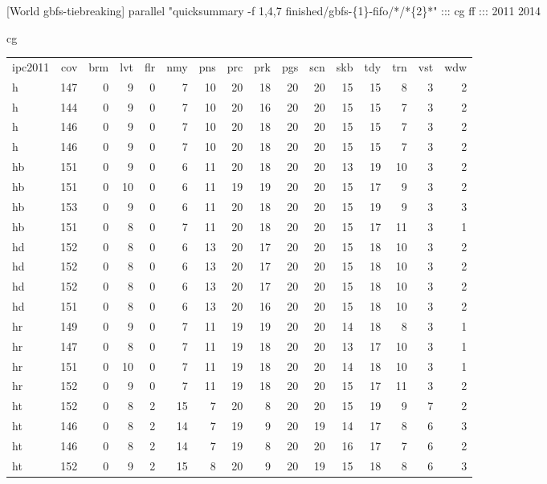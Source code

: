 [World gbfs-tiebreaking] parallel "quicksummary -f 1,4,7 finished/gbfs-\{1\}-fifo/*/*\{2\}*" ::: cg ff ::: 2011 2014

cg

\begin{center}
\begin{tabular}{lrrrrrrrrrrrrrrr}
ipc2011 & cov & brm & lvt & flr & nmy & pns & prc & prk & pgs & scn & skb & tdy & trn & vst & wdw\\
h & 147 & 0 & 9 & 0 & 7 & 10 & 20 & 18 & 20 & 20 & 15 & 15 & 8 & 3 & 2\\
h & 144 & 0 & 9 & 0 & 7 & 10 & 20 & 16 & 20 & 20 & 15 & 15 & 7 & 3 & 2\\
h & 146 & 0 & 9 & 0 & 7 & 10 & 20 & 18 & 20 & 20 & 15 & 15 & 7 & 3 & 2\\
h & 146 & 0 & 9 & 0 & 7 & 10 & 20 & 18 & 20 & 20 & 15 & 15 & 7 & 3 & 2\\
hb & 151 & 0 & 9 & 0 & 6 & 11 & 20 & 18 & 20 & 20 & 13 & 19 & 10 & 3 & 2\\
hb & 151 & 0 & 10 & 0 & 6 & 11 & 19 & 19 & 20 & 20 & 15 & 17 & 9 & 3 & 2\\
hb & 153 & 0 & 9 & 0 & 6 & 11 & 20 & 18 & 20 & 20 & 15 & 19 & 9 & 3 & 3\\
hb & 151 & 0 & 8 & 0 & 7 & 11 & 20 & 18 & 20 & 20 & 15 & 17 & 11 & 3 & 1\\
hd & 152 & 0 & 8 & 0 & 6 & 13 & 20 & 17 & 20 & 20 & 15 & 18 & 10 & 3 & 2\\
hd & 152 & 0 & 8 & 0 & 6 & 13 & 20 & 17 & 20 & 20 & 15 & 18 & 10 & 3 & 2\\
hd & 152 & 0 & 8 & 0 & 6 & 13 & 20 & 17 & 20 & 20 & 15 & 18 & 10 & 3 & 2\\
hd & 151 & 0 & 8 & 0 & 6 & 13 & 20 & 16 & 20 & 20 & 15 & 18 & 10 & 3 & 2\\
hr & 149 & 0 & 9 & 0 & 7 & 11 & 19 & 19 & 20 & 20 & 14 & 18 & 8 & 3 & 1\\
hr & 147 & 0 & 8 & 0 & 7 & 11 & 19 & 18 & 20 & 20 & 13 & 17 & 10 & 3 & 1\\
hr & 151 & 0 & 10 & 0 & 7 & 11 & 19 & 18 & 20 & 20 & 14 & 18 & 10 & 3 & 1\\
hr & 152 & 0 & 9 & 0 & 7 & 11 & 19 & 18 & 20 & 20 & 15 & 17 & 11 & 3 & 2\\
ht & 152 & 0 & 8 & 2 & 15 & 7 & 20 & 8 & 20 & 20 & 15 & 19 & 9 & 7 & 2\\
ht & 146 & 0 & 8 & 2 & 14 & 7 & 19 & 9 & 20 & 19 & 14 & 17 & 8 & 6 & 3\\
ht & 146 & 0 & 8 & 2 & 14 & 7 & 19 & 8 & 20 & 20 & 16 & 17 & 7 & 6 & 2\\
ht & 152 & 0 & 9 & 2 & 15 & 8 & 20 & 9 & 20 & 19 & 15 & 18 & 8 & 6 & 3\\
\end{tabular}
\end{center}

